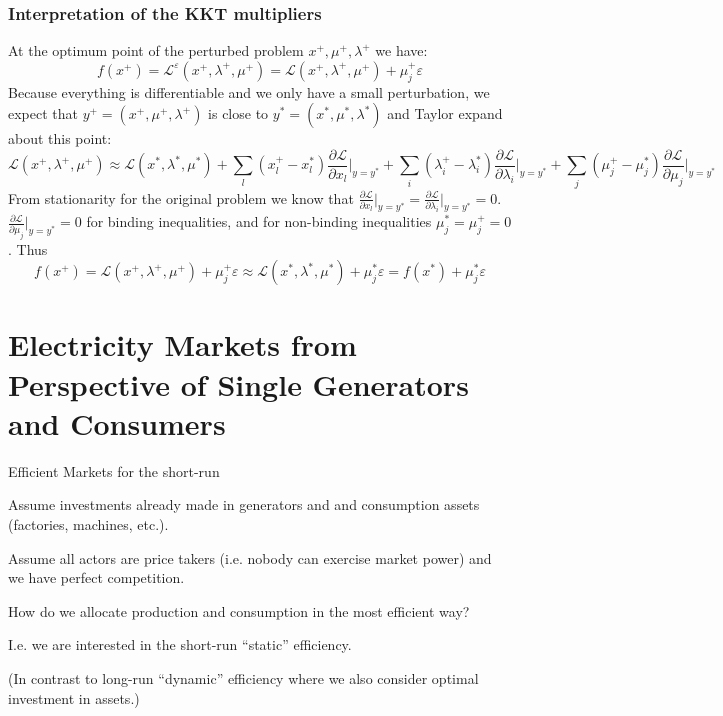 \documentclass[10pt,aspectratio=169,dvipsnames]{beamer}
\def\l{\lambda}
\def\m{\mu}
\def\d{\partial}
\def\cL{\mathcal{L}}
\begin{document}
\begin{frame}
  \frametitle{Interpretation of the KKT multipliers}

  At the optimum point of the perturbed problem $x^+,\m^+,\l^+$ we have:
  \begin{equation*}
    f(x^+)  =   \cL^\varepsilon(x^+,\l^+,\m^+) = \cL(x^+,\l^+,\m^+) + \m_j^+\varepsilon
  \end{equation*}
  Because everything is differentiable and we only have a small perturbation, we expect that $y^+ = (x^+,\m^+,\l^+)$ is close to $y^* = (x^*,\m^*,\l^*)$ and Taylor expand about this point:
  \begin{equation*}
    \cL(x^+,\l^+,\m^+)  \approx \cL(x^*,\l^*,\m^*) +  \sum_l (x^+_l - x^*_l) \frac{\d \cL }{\d x_l} \Big|_{y = y^*}+ \sum_i (\l^+_i - \l^*_i) \frac{\d \cL }{\d \l_i} \Big|_{y = y^*}+ \sum_j (\m^+_j - \m^*_j) \frac{\d \cL }{\d \m_j} \Big|_{y = y^*}
  \end{equation*}
  From stationarity for the original problem we know that $\frac{\d \cL }{\d x_l} \Big|_{y = y^*} = \frac{\d \cL }{\d \l_i} \Big|_{y = y^*} = 0$. $\frac{\d \cL }{\d \m_j} \Big|_{y = y^*} = 0$ for binding inequalities, and for non-binding inequalities $\m^*_j = \m^+_j = 0$. Thus
  \begin{equation*}
    f(x^+)  =   \cL(x^+,\l^+,\m^+) + \m_j^+\varepsilon \approx \cL(x^*,\l^*,\m^*) + \m_j^*\varepsilon = f(x^*) + \m_j^*\varepsilon
\end{equation*}

\end{frame}

\section{Electricity Markets from Perspective of Single Generators and Consumers}

\begin{frame}{Efficient Markets for the short-run}


  Assume investments already made in generators and and consumption assets (factories, machines, etc.).

  Assume all actors are price takers (i.e. nobody can exercise market power) and we have perfect competition.

  How do we allocate production and consumption in the most efficient way?


  I.e. we are interested in the \alert{short-run ``static'' efficiency}.

  \vspace{.7cm}

  (In contrast to \alert{long-run ``dynamic'' efficiency} where we also consider optimal investment in assets.)
\end{frame}
\end{document}
